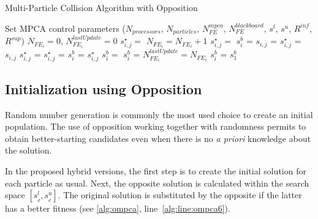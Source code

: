 \begin{algorithm}[H]
\caption{Multi-Particle Collision Algorithm with Opposition}
\label{alg:ompca}
\footnotesize
\begin{algorithmic}[1]
\State Set MPCA control parameters ($N_{processors}$, $N_{particles}$, $N_{FE}^{mpca}$, $N_{FE}^{blackboard}$, $s^l$, $s^u$, $R^{inf}$, $R^{sup}$)
 
\State $N_{FE_i} = 0$, $N_{FE_i}^{lastUpdate} = 0$
\State $s^\star_{i,j} = $ 
\State $N_{FE_i} = N_{FE_i} + 1$
\State $s^\star_{i,j} = $  \label{alg:line:ompca6}
\EndFor
\EndFor
{} 
\State $s^b_i$ =  
\EndFor
{} 
\State $s_{i,j}$ = 
\State $s^\star_{i,j}$ = $s_{i,j}$
\State $s^\star_{i,j}$ = 
\Else
\State $s^\star_{i,j}$ = 
\EndIf
{}
\State $s^b_i$ = $s^\star_{i,j}$
\EndIf
\State $s^b_i = $  \label{alg:line:ompca20}
\EndFor
\EndFor
{}
 
\State $s^b_i$ = 
\State $N_{FE_i}^{lastUpdate} = N_{FE_i}$
\EndFor
\EndIf
\EndWhile
{} 
\State $s^b_i$ =  
\EndFor
\State \Return $s^b_1$
\end{algorithmic}
\end{algorithm}

\subsection{Initialization using Opposition}

Random number generation is commonly the most used choice to create an initial population. The use of opposition working together with randomness permits to obtain better-starting candidates even when there is no \textit{a priori} knowledge about the solution.

In the proposed hybrid versions, the first step is to create the initial solution for each particle as usual. Next, the opposite solution is calculated within the search space $\left[ s^l_{_d}, s^u_{_d} \right]$. The original solution is substituted by the opposite if the latter has a better fitness (see \autoref{alg:ompca}, line~\ref{alg:line:ompca6}).

